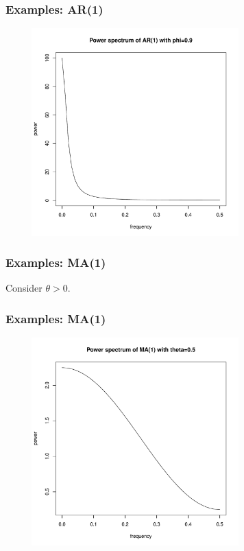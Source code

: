 \documentclass[%
xcolor=pdftex]{beamer}
\begin{document}
\begin{frame}
\frametitle{Examples: AR(1)}

\includegraphics[width=100mm, height=80mm]{ar1_1power.pdf}

\end{frame}








\begin{frame}
\frametitle{Examples: MA(1)}

Consider $\theta>0$.

\vspace{50mm}

\end{frame}

\begin{frame}
\frametitle{Examples: MA(1)}

\includegraphics[width=100mm, height=80mm]{ma1_1power.pdf}

\end{frame}
\end{document}
